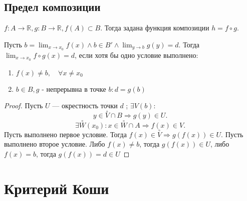 \documentclass[11pt]{book}
\newcommand{\R}{\mathbb{R}}
\newcommand{\pivi}{\stackrel \circ }
\theoremstyle{definition}
\theoremstyle{plain}
\theoremstyle{plain}
\theoremstyle{definition}
\theoremstyle{remark}
\begin{document}
\subsection{Предел композиции}\label{ques_37}
\begin{defn}
    $f : A \to  \R, g: B \to  \R, f(A) \subset B$. Тогда задана функция композиции $h = f \circ g$.
\end{defn}
\begin{thm}
    Пусть $b = \lim_{x \to x_0} f(x) \wedge b \in  B' \wedge \lim_{y \to  b} g(y) = d $. Тогда $\lim_{x \to  x_0} f \circ g (x)= d$, если хотя бы одно условие выполнено:
    \begin{enumerate}
	\item $f(x) \ne b, \quad \forall x \ne x_0$ 
	\item $b \in  B, g \mbox{ - непрерывна в точке }b: d = g(b)$
    \end{enumerate}
\end{thm}
\begin{proof}
    Пусть $U$ --- окрестность точки $d$ ; $\exists V(b)$:
    \[
	y \in  \pivi V \cap B \Rightarrow g(y) \in  U
    .\] 
    \[
	\exists \pivi W(x_0): x \in  \pivi W \cap A \Rightarrow  f(x) \in  V
    .\] 
    Пусть выполнено первое условие. Тогда $f(x) \in  \pivi V \Longrightarrow   g(f(x)) \in U$.
    Пусть выполнено второе условие. Либо $f(x) \ne b$, тогда $g(f(x)) \in  U$, либо $f(x) = b$, тогда $g(f(x)) = d \in  U$
\end{proof}

\section{Критерий Коши}
\end{document}
